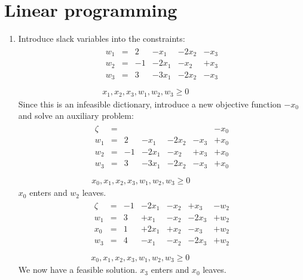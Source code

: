 \documentclass[12pt]{article}
\begin{document}
\section{Linear programming}

\begin{enumerate}
\item %
Introduce slack variables into the constraints:
%
\begin{eqnarray*}
\begin{array}{llllll}
w_1 & = & 2  & -x_1  & -2x_2 & -x_3\\
w_2 & = & -1 & -2x_1 & -x_2  & +x_3\\
w_3 & = & 3  & -3x_1 & -2x_2 & -x_3\\
\end{array}\\
x_1,x_2,x_3,w_1,w_2,w_3 \ge 0
\end{eqnarray*}
%
Since this is an infeasible dictionary, introduce a new objective function
$-x_0$ and solve an auxiliary problem:
%
\begin{eqnarray*}
\begin{array}{lllllll}
\zeta & = &  &       &       &      & -x_0\\
w_1 & = & 2  & -x_1  & -2x_2 & -x_3 & +x_0\\
w_2 & = & -1 & -2x_1 & -x_2  & +x_3 & +x_0\\
w_3 & = & 3  & -3x_1 & -2x_2 & -x_3 & +x_0\\
\end{array}\\
x_0,x_1,x_2,x_3,w_1,w_2,w_3 \ge 0
\end{eqnarray*}
%
$x_0$ enters and $w_2$ leaves.
%
\begin{eqnarray*}
\begin{array}{lllllll}
\zeta & = & -1 & -2x_1 & -x_2 & +x_3 & -w_2\\
w_1 & = & 3 & +x_1  & -x_2 & -2x_3 & +w_2\\
x_0 & = & 1 & +2x_1 & +x_2 & -x_3  & +w_2\\
w_3 & = & 4 & -x_1  & -x_2 & -2x_3 & +w_2\\
\end{array}\\
x_0,x_1,x_2,x_3,w_1,w_2,w_3 \ge 0
\end{eqnarray*}
%
We now have a feasible solution. $x_3$ enters and $x_0$ leaves.

\end{enumerate}
\end{document}
